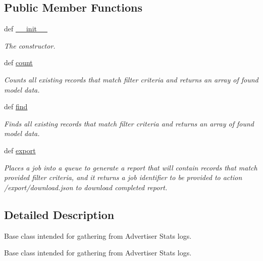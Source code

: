 \subsection*{Public Member Functions}
\begin{DoxyCompactItemize}
\item 
def \hyperlink{classtune_1_1management_1_1reports_1_1reports__logs__base_1_1ReportsLogsBase_a61c9ec1789d7b39d2fe86261b38e4c1b}{\-\_\-\-\_\-init\-\_\-\-\_\-}
\begin{DoxyCompactList}\small\item\em The constructor. \end{DoxyCompactList}\item 
def \hyperlink{classtune_1_1management_1_1reports_1_1reports__logs__base_1_1ReportsLogsBase_aed75ad9c6fddb320f4a4dff10d988730}{count}
\begin{DoxyCompactList}\small\item\em Counts all existing records that match filter criteria and returns an array of found model data. \end{DoxyCompactList}\item 
def \hyperlink{classtune_1_1management_1_1reports_1_1reports__logs__base_1_1ReportsLogsBase_aa5e600c4e26a37c9f71230b38b53a7fb}{find}
\begin{DoxyCompactList}\small\item\em Finds all existing records that match filter criteria and returns an array of found model data. \end{DoxyCompactList}\item 
def \hyperlink{classtune_1_1management_1_1reports_1_1reports__logs__base_1_1ReportsLogsBase_adb84c7933f69d2e513859acd5c542a71}{export}
\begin{DoxyCompactList}\small\item\em Places a job into a queue to generate a report that will contain records that match provided filter criteria, and it returns a job identifier to be provided to action /export/download.json to download completed report. \end{DoxyCompactList}\end{DoxyCompactItemize}


\subsection{Detailed Description}
Base class intended for gathering from Advertiser Stats logs. 

Base class intended for gathering from Advertiser Stats logs. 

